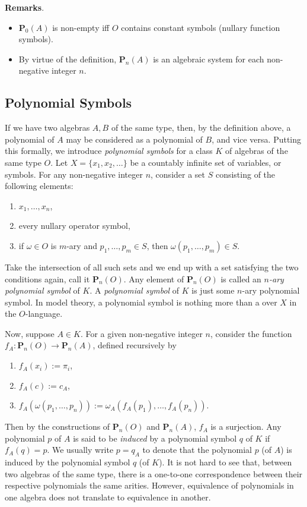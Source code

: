 \documentclass[12pt]{article}
\begin{document}
\textbf{Remarks}.  
\begin{itemize}
\item
$\textbf{P}_0(A)$ is non-empty iff $O$ contains constant symbols (nullary function symbols).
\item
By virtue of the definition, $\textbf{P}_n(A)$ is an algebraic system for each non-negative integer $n$.
\end{itemize}

\subsection*{Polynomial Symbols}
If we have two algebras $A,B$ of the same type, then, by the definition above, a polynomial of $A$ may be considered as a polynomial of $B$, and vice versa.  Putting this formally, we introduce \emph{polynomial symbols} for a class $K$ of algebras of the same type $O$.  Let $X=\lbrace x_1,x_2,\ldots\rbrace$ be a countably infinite set of variables, or symbols.  For any non-negative integer $n$, consider a set $S$ consisting of the following elements:
\begin{enumerate}
\item $x_1,\ldots,x_n$,
\item every nullary operator symbol,
\item if $\omega\in O$ is $m$-ary and $p_1,\ldots,p_m\in S$, then $\omega(p_1, \ldots, p_m)\in S$.
\end{enumerate}
Take the intersection of all such sets and we end up with a set satisfying the two conditions again, call it $\textbf{P}_n(O)$.  Any element of $\textbf{P}_n(O)$ is called an \emph{$n$-ary polynomial symbol} of $K$.  A \emph{polynomial symbol} of $K$ is just some $n$-ary polynomial symbol.  In model theory, a polynomial symbol is nothing more than a  over $X$ in the $O$-language.

Now, suppose $A\in K$.  For a given non-negative integer $n$, consider the function $f_A:\textbf{P}_n(O)\to \textbf{P}_n(A)$, defined recursively by 
\begin{enumerate}
\item $f_A(x_i):=\pi_i$,
\item $f_A(c):=c_A$,
\item $f_A(\omega(p_1,\ldots,p_n)):=\omega_A(f_A(p_1),\ldots,f_A(p_n))$.
\end{enumerate}
Then by the constructions of $\textbf{P}_n(O)$ and $\textbf{P}_n(A)$, $f_A$ is a surjection.  Any polynomial $p$ of $A$ is said to be \emph{induced} by a polynomial symbol $q$ of $K$ if $f_A(q)=p$.  We usually write $p=q_A$ to denote that the polynomial $p$ (of $A$) is induced by the polynomial symbol $q$ (of $K$).  It is not hard to see that, between two algebras of the same type, there is a one-to-one correspondence between their respective polynomials the same arities.  However, equivalence of polynomials in one algebra does not translate to equivalence in another.
\end{document}

